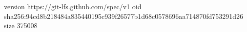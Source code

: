 version https://git-lfs.github.com/spec/v1
oid sha256:94cd8b218484a835440195c939f26577b1d68c0578696aa714870fd753291d26
size 375008
